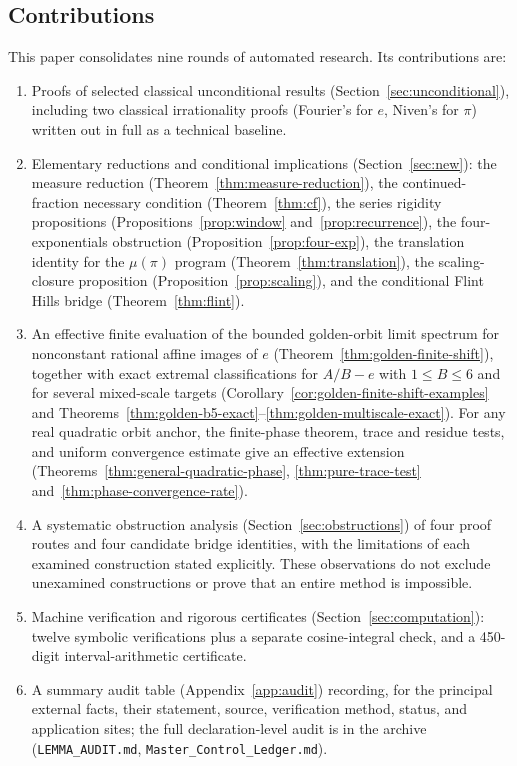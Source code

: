 \documentclass[11pt]{amsart}
\theoremstyle{definition}
\theoremstyle{remark}
\numberwithin{equation}{section}
\newcommand{\irr}{\mu}
\newcommand{\ee}{e}
\begin{document}
\subsection{Contributions} This paper consolidates nine rounds of automated research. Its contributions are:
\begin{enumerate}
\item Proofs of selected classical unconditional results (Section~\ref{sec:unconditional}), including two classical irrationality proofs (Fourier's for $\ee$, Niven's for $\pi$) written out in full as a technical baseline.
\item Elementary reductions and conditional implications (Section~\ref{sec:new}): the measure reduction (Theorem~\ref{thm:measure-reduction}), the continued-fraction necessary condition (Theorem~\ref{thm:cf}), the series rigidity propositions (Propositions~\ref{prop:window} and~\ref{prop:recurrence}), the four-exponentials obstruction (Proposition~\ref{prop:four-exp}), the translation identity for the $\irr(\pi)$ program (Theorem~\ref{thm:translation}), the scaling-closure proposition (Proposition~\ref{prop:scaling}), and the conditional Flint Hills bridge (Theorem~\ref{thm:flint}).
\item An effective finite evaluation of the bounded golden-orbit limit
spectrum for nonconstant rational affine images of $e$
(Theorem~\ref{thm:golden-finite-shift}), together with exact extremal
classifications for $A/B-e$ with $1\le B\le6$ and for several mixed-scale
targets (Corollary~\ref{cor:golden-finite-shift-examples} and
Theorems~\ref{thm:golden-b5-exact}--\ref{thm:golden-multiscale-exact}).
For any real quadratic orbit anchor, the finite-phase theorem, trace and
residue tests, and uniform convergence estimate give an effective extension
(Theorems~\ref{thm:general-quadratic-phase}, \ref{thm:pure-trace-test}
and~\ref{thm:phase-convergence-rate}).
\item A systematic obstruction analysis (Section~\ref{sec:obstructions}) of four proof routes and four candidate bridge identities, with the limitations of each examined construction stated explicitly. These observations do not exclude unexamined constructions or prove that an entire method is impossible.
\item Machine verification and rigorous certificates (Section~\ref{sec:computation}): twelve symbolic verifications plus a separate cosine-integral check, and a 450-digit interval-arithmetic certificate.
\item A summary audit table (Appendix~\ref{app:audit}) recording, for the principal external facts, their statement, source, verification method, status, and application sites; the full declaration-level audit is in the archive (\texttt{LEMMA\_AUDIT.md}, \texttt{Master\_Control\_Ledger.md}).

\end{enumerate}
\end{document}
